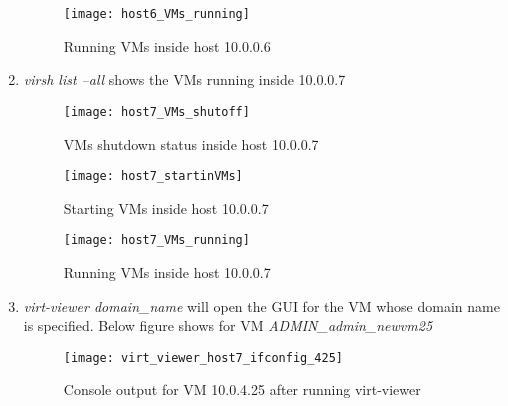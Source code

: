 \begin{enumerate}
\begin{figure}[h]
\end{figure}

\begin{figure}[h]
\caption{Running VMs inside host 10.0.0.6}
\centering
\texttt{[image: host6\_VMs\_running]}

\end{figure}

\item \textit{virsh list --all} shows the VMs running inside 10.0.0.7

\begin{figure}[h]
\caption{VMs shutdown status inside host 10.0.0.7}
\centering
\texttt{[image: host7\_VMs\_shutoff]}

\end{figure}

\begin{figure}[h]
\caption{Starting VMs inside host 10.0.0.7}
\centering
\texttt{[image: host7\_startinVMs]}

\end{figure}

\begin{figure}[h]
\caption{Running VMs inside host 10.0.0.7}
\centering
\texttt{[image: host7\_VMs\_running]}

\end{figure}

\item \textit{virt-viewer domain\_name} will open the GUI for the VM whose domain name is specified. Below figure shows for VM \textit{ADMIN\_admin\_newvm25}


\begin{figure}[h]
\caption{Console output for VM 10.0.4.25 after running virt-viewer}
\centering
\texttt{[image: virt\_viewer\_host7\_ifconfig\_425]}
\end{figure}
\end{enumerate}
